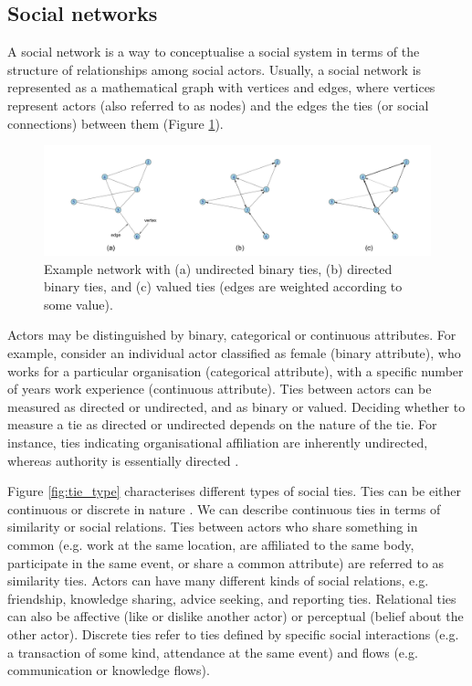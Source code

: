 \subsection{Social networks}

A social network is a way to conceptualise a social system in terms of the structure of relationships among social actors. Usually, a social network is represented as a mathematical graph with vertices and edges, where vertices represent actors (also referred to as nodes) and the edges the ties (or social connections) between them (Figure \ref{fig:examples}). \medskip

\begin{figure}
	\centering
	\includegraphics[width=1.0\linewidth]{Images/example_networks.png}
	\caption{Example network with (a) undirected binary ties, (b) directed binary ties, and (c) valued ties (edges are weighted according to some value).}
	\label{fig:examples}
\end{figure}

 Actors may be distinguished by binary, categorical or continuous attributes. For example, consider an individual actor classified as female (binary attribute), who works for a particular organisation (categorical attribute), with a specific number of years work experience (continuous attribute). Ties between actors can be measured as directed or undirected, and as binary or valued. Deciding whether to measure a tie as directed or undirected depends on the nature of the tie. For instance, ties indicating organisational affiliation are inherently undirected, whereas authority is essentially directed \citep{borgatti2013analyzing}. \medskip
 
 Figure \ref{fig:tie_type} characterises different types of social ties. Ties can be either continuous or discrete in nature \citep{borgatti2013analyzing}. We can describe continuous ties in terms of similarity or social relations. Ties between actors who share something in common (e.g. work at the same location, are affiliated to the same body, participate in the same event, or share a common attribute) are referred to as similarity ties. Actors can have many different kinds of social relations, e.g. friendship, knowledge sharing, advice seeking, and reporting ties. Relational ties can also be affective (like or dislike another actor) or perceptual (belief about the other actor). Discrete ties refer to ties defined by specific social interactions (e.g. a transaction of some kind, attendance at the same event) and flows (e.g. communication or knowledge flows). \medskip

